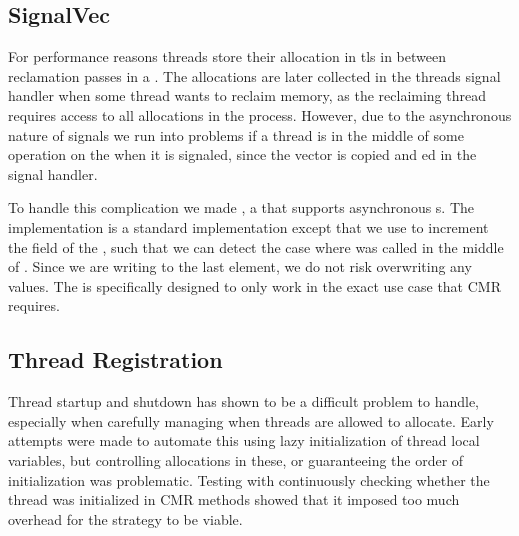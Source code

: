\subsection{SignalVec\label{sec:impl-signalvec}}

For performance reasons threads store their allocation in \gls{tls} in between reclamation passes
in a .  The allocations are later collected in the threads signal handler when some
thread wants to reclaim memory, as the reclaiming thread requires access to all allocations in the
process. However, due to the asynchronous nature of signals we run into problems if a thread is in
the middle of some operation on the  when it is signaled, since the vector is copied and
ed in the signal handler.

To handle this complication we made , a  that supports asynchronous
s. The implementation is a standard  implementation except that we use
 to increment the  field of the , such that we can detect
the case where  was called in the middle of . Since we are writing to the
last element, we do not risk overwriting any values. The  is specifically designed
to only work in the exact use case that CMR requires.


\subsection{Thread Registration\label{sec:impl-thread-registration}}

Thread startup and shutdown has shown to be a difficult problem to handle, especially when
carefully managing when threads are allowed to allocate. Early attempts were made to automate this
using lazy initialization of thread local variables, but controlling allocations in these, or
guaranteeing the order of initialization was problematic. Testing with continuously checking whether
the thread was initialized in CMR methods showed that it imposed too much overhead for the strategy
to be viable.









